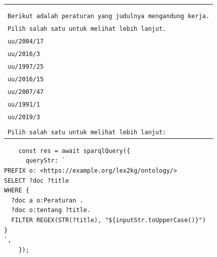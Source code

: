 \begin{listing}[H]
  \begin{center}
    \begin{tabular}{|p{}|}
      \hline
      \makecell[l]{
        \texttt{Masukkan Kata Kunci Peraturan: \textcolor{red}{kerja}}    \\ \\
        \texttt{Berikut adalah peraturan yang judulnya mengandung kerja.} \\
        \texttt{Pilih salah satu untuk melihat lebih lanjut.}             \\
        \texttt{uu/2004/17}                                               \\
        \texttt{uu/2016/3}                                                \\
        \texttt{uu/1997/25}                                               \\
        \texttt{uu/2016/15}                                               \\
        \texttt{uu/2007/47}                                               \\
        \texttt{uu/1991/1}                                                \\
        \texttt{uu/2019/3}                                                \\ \\
        \texttt{Pilih salah satu untuk melihat lebih lanjut: }
      }                                                                   \\
      \hline
    \end{tabular}
  \end{center}
  \caption{Tampilan \textit{chat bot} untuk Skenario 1}
  \label{lst:chatbot-1}
\end{listing}

\begin{listing}[H]
  \begin{verbatim}
    const res = await sparqlQuery({
      queryStr: `
PREFIX o: <https://example.org/lex2kg/ontology/>
SELECT ?doc ?title
WHERE {
  ?doc a o:Peraturan .
  ?doc o:tentang ?title.
  FILTER REGEX(STR(?title), "${inputStr.toUpperCase()}")
}
`,
    });
  \end{verbatim}
  \caption{\textit{Query} template untuk Skenario 1}
  \label{lst:chatbot-1-query}
\end{listing}


